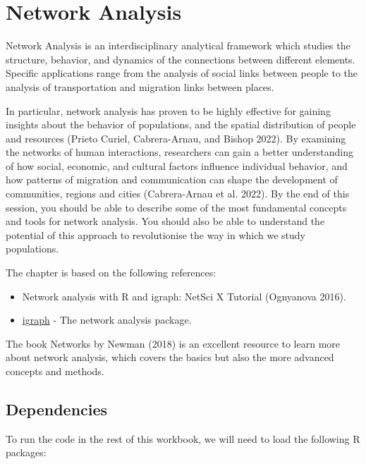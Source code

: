 \documentclass[
  letterpaper,
  DIV=11,
  numbers=noendperiod]{scrreprt}
\begin{document}

\hypertarget{sec-chp5}{%
\chapter{Network Analysis}\label{sec-chp5}}

Network Analysis is an interdisciplinary analytical framework which
studies the structure, behavior, and dynamics of the connections between
different elements. Specific applications range from the analysis of
social links between people to the analysis of transportation and
migration links between places.

In particular, network analysis has proven to be highly effective for
gaining insights about the behavior of populations, and the spatial
distribution of people and resources (Prieto Curiel, Cabrera-Arnau, and
Bishop 2022). By examining the networks of human interactions,
researchers can gain a better understanding of how social, economic, and
cultural factors influence individual behavior, and how patterns of
migration and communication can shape the development of communities,
regions and cities (Cabrera-Arnau et al. 2022). By the end of this
session, you should be able to describe some of the most fundamental
concepts and tools for network analysis. You should also be able to
understand the potential of this approach to revolutionise the way in
which we study populations.

The chapter is based on the following references:

\begin{itemize}
\item
  Network analysis with R and igraph: NetSci X Tutorial (Ognyanova
  2016).
\item
  \href{https://igraph.org/}{igraph} - The network analysis package.
\end{itemize}

The book Networks by Newman (2018) is an excellent resource to learn
more about network analysis, which covers the basics but also the more
advanced concepts and methods.

\hypertarget{sec-sec_dependencies}{%
\section{Dependencies}\label{sec-sec_dependencies}}

To run the code in the rest of this workbook, we will need to load the
following R packages:
\end{document}
